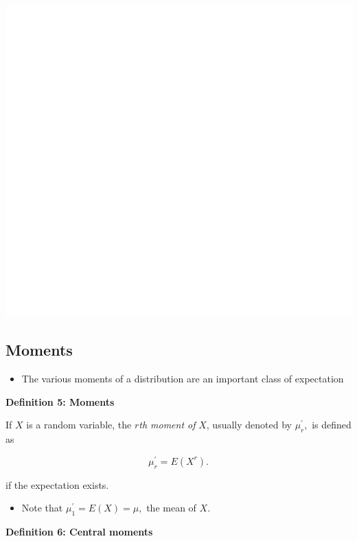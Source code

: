 \documentclass[]{book}
\providecommand{\tightlist}{%
  \setlength{\itemsep}{0pt}\setlength{\parskip}{0pt}}
\begin{document}
\begin{center}\includegraphics[width=1\linewidth]{figure/Ch1box15-1} \end{center}

\newpage

\hypertarget{moments}{%
\subsection{Moments}\label{moments}}

\begin{itemize}
\tightlist
\item
  The various moments of a distribution are an important class of expectation
\end{itemize}

\textbf{Definition 5: Moments}

If \(X\) is a random variable, the \(r\)\emph{th moment of} \(X\), usually denoted by \(\mu_r^\prime,\) is defined as

\[\mu_r^\prime = E(X^r).\]

if the expectation exists.

\begin{itemize}
\tightlist
\item
  Note that \(\mu_1^\prime = E(X)= \mu,\) the mean of \(X\).
\end{itemize}

\textbf{Definition 6: Central moments}
\end{document}
